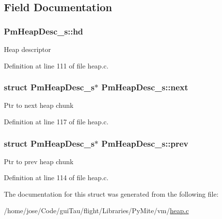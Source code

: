 \subsection{Field Documentation}
\hypertarget{struct_pm_heap_desc__s_a2767ec86ed357adc57fa8cd5711e40d0}{
\subsubsection[{hd}]{ Pm\-Heap\-Desc\-\_\-s\-::hd}}\label{struct_pm_heap_desc__s_a2767ec86ed357adc57fa8cd5711e40d0}
Heap descriptor 

Definition at line 111 of file heap.\-c.

\hypertarget{struct_pm_heap_desc__s_a0b0227b78c1547dc5d2f9025b9c4a99c}{
\subsubsection[{next}]{\setlength{\rightskip}{0pt plus 5cm}struct {\bf Pm\-Heap\-Desc\-\_\-s}$\ast$ Pm\-Heap\-Desc\-\_\-s\-::next}}\label{struct_pm_heap_desc__s_a0b0227b78c1547dc5d2f9025b9c4a99c}
Ptr to next heap chunk 

Definition at line 117 of file heap.\-c.

\hypertarget{struct_pm_heap_desc__s_a19e11087672adf23918da958588846f1}{
\subsubsection[{prev}]{\setlength{\rightskip}{0pt plus 5cm}struct {\bf Pm\-Heap\-Desc\-\_\-s}$\ast$ Pm\-Heap\-Desc\-\_\-s\-::prev}}\label{struct_pm_heap_desc__s_a19e11087672adf23918da958588846f1}
Ptr to prev heap chunk 

Definition at line 114 of file heap.\-c.



The documentation for this struct was generated from the following file\-:\begin{DoxyCompactItemize}
\item 
/home/jose/\-Code/gui\-Tau/flight/\-Libraries/\-Py\-Mite/vm/\hyperlink{heap_8c}{heap.\-c}\end{DoxyCompactItemize}
